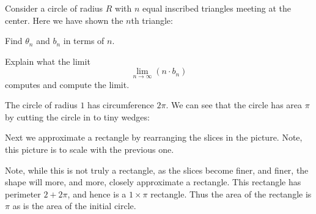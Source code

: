 \documentclass[hints,handout,noauthor,nooutcomes,12pt]{ximera}
\begin{document}
\begin{problem}
Consider a circle of radius $R$ with $n$ equal inscribed triangles
meeting at the center.  Here we have shown the $n$th triangle:
\begin{image}
\end{image}
Find $\theta_n$ and $b_n$ in terms of $n$.
\end{problem}


\begin{problem}
Explain what the limit
\[
\lim_{n\to\infty} \left(n\cdot b_n\right)
\]
computes and compute the limit.
\end{problem}



The circle of radius $1$ has circumference $2\pi$. We can see that the
circle has area $\pi$ by cutting the circle in to tiny wedges:
\begin{image}
\end{image}

Next we approximate a rectangle by rearranging the slices in the
picture. Note, this picture is to scale with the previous one.
\begin{image}
\end{image}
Note, while this is not truly a rectangle, as the slices become finer,
and finer, the shape will more, and more, closely approximate a
rectangle. This rectangle has perimeter $2+2\pi$, and hence is a
$1\times \pi$ rectangle. Thus the area of the rectangle is $\pi$ as is
the area of the initial circle.
\end{document}

